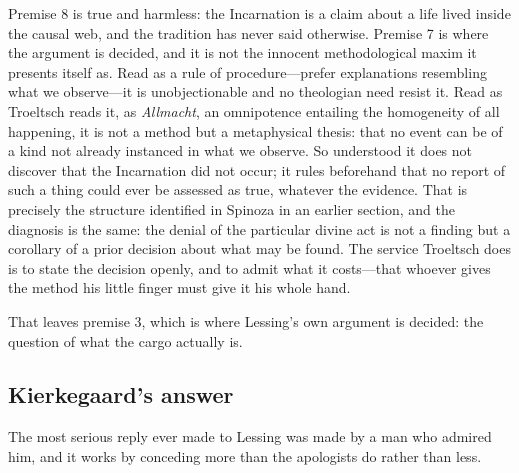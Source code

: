 Premise 8 is true and harmless: the Incarnation is a claim about a life lived inside the causal web, and the tradition has never said otherwise. Premise 7 is where the argument is decided, and it is not the innocent methodological maxim it presents itself as. Read as a rule of procedure---prefer explanations resembling what we observe---it is unobjectionable and no theologian need resist it. Read as Troeltsch reads it, as \emph{Allmacht}, an omnipotence entailing the homogeneity of all happening, it is not a method but a metaphysical thesis: that no event can be of a kind not already instanced in what we observe. So understood it does not discover that the Incarnation did not occur; it rules beforehand that no report of such a thing could ever be assessed as true, whatever the evidence. That is precisely the structure identified in Spinoza in an earlier section, and the diagnosis is the same: the denial of the particular divine act is not a finding but a corollary of a prior decision about what may be found. The service Troeltsch does is to state the decision openly, and to admit what it costs---that whoever gives the method his little finger must give it his whole hand.

That leaves premise 3, which is where Lessing's own argument is decided: the question of what the cargo actually is.

\subsection{Kierkegaard's answer}

The most serious reply ever made to Lessing was made by a man who admired him, and it works by conceding more than the apologists do rather than less.

